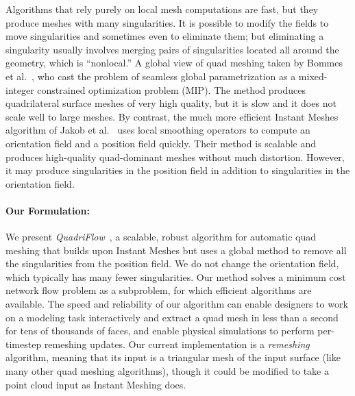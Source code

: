 Algorithms that rely purely on local mesh computations are fast, but they produce meshes with many singularities. It is possible to modify the fields to move singularities and sometimes even to eliminate them; but eliminating a singularity
usually involves merging pairs of singularities located all around the geometry, which is ``nonlocal.'' 
A global view of quad meshing taken by Bommes et al.~\cite{bommes2009mixed}, who cast the problem of seamless global parametrization as a mixed-integer constrained optimization problem (MIP).
The method produces quadrilateral surface meshes of very high quality, but it is slow and it does not scale well to large meshes. By contrast, the much more efficient Instant Meshes algorithm of Jakob et al.~\cite{jakob2015instant} uses local smoothing operators to compute an orientation field and a position field quickly. Their method is scalable and produces high-quality quad-dominant meshes without much distortion. However, it may produce singularities in the position field in addition to singularities in the orientation field.

\paragraph*{Our Formulation:} We present \emph{QuadriFlow}~\cite{huang2018quadriflow}, a scalable, robust algorithm for automatic quad meshing that builds upon Instant Meshes but uses a global method to remove all the singularities from the position field.
We do not change the orientation field, which typically has many fewer singularities. Our method solves a minimum cost network flow problem as a subproblem, for which efficient algorithms are available. The speed and reliability of our algorithm can enable designers to work on a modeling task interactively and extract a quad mesh in less than a second for tens of thousands of faces, and enable physical simulations to perform per-timestep remeshing updates. Our current implementation is a \emph{remeshing} algorithm, meaning that its input is a triangular mesh of the input surface (like many other quad meshing algorithms), though it could be modified to take a point cloud input as Instant Meshing does.

